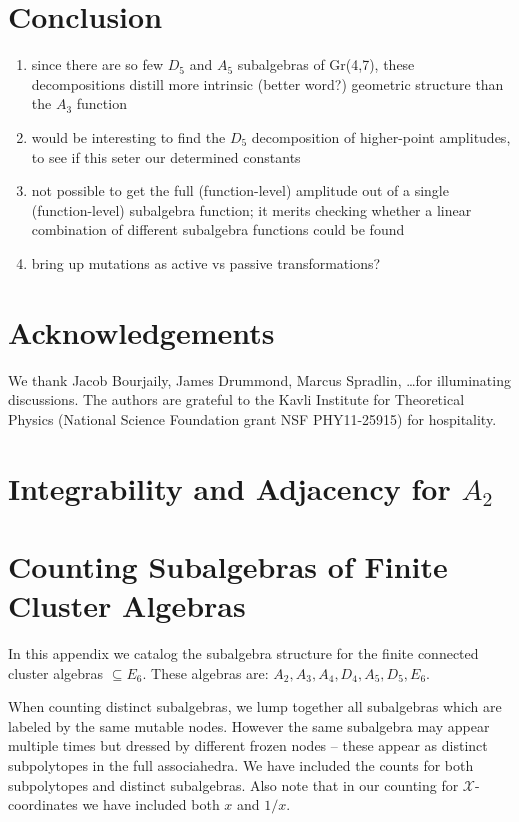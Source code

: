 \documentclass[11pt]{article}
\def\xcoords{$\mathcal{X}$-coordinates }
\def\pdfeq#1{\texorpdfstring{$#1$}{a}}
\begin{document}
\section{Conclusion}

\begin{enumerate}
\item since there are so few $D_5$ and $A_5$ subalgebras of Gr(4,7), these decompositions distill more intrinsic (better word?) geometric structure than the $A_3$ function 
\item would be interesting to find the $D_5$ decomposition of higher-point amplitudes, to see if this seter our determined constants
\item not possible to get the full (function-level) amplitude out of a single (function-level) subalgebra function; it merits checking whether a linear combination of different subalgebra functions could be found
\item bring up mutations as active vs passive transformations?
\end{enumerate}

\section*{Acknowledgements}

We thank Jacob Bourjaily, James Drummond, Marcus Spradlin, \dots for illuminating discussions. The authors are grateful to the Kavli Institute for Theoretical Physics (National Science Foundation grant NSF PHY11-25915) for hospitality. 


\appendix

\section{Integrability and Adjacency for \pdfeq{A_2}}  \label{appendix:integrable_A2}

\section{Counting Subalgebras of Finite Cluster Algebras}\label{appendix:subalgebras}
In this appendix we catalog the subalgebra structure for the finite connected cluster algebras \(\subseteq E_6\). These algebras are: \(A_2, A_3, A_4, D_4, A_5, D_5, E_6\).

When counting distinct subalgebras, we lump together all subalgebras which are labeled by the same mutable nodes. However the same subalgebra may appear multiple times but dressed by different frozen nodes -- these appear as distinct subpolytopes in the full associahedra. We have included the counts for both subpolytopes and distinct subalgebras. Also note that in our counting for \xcoords we have included both $x$ and $1/x$.\\ 
\end{document}
